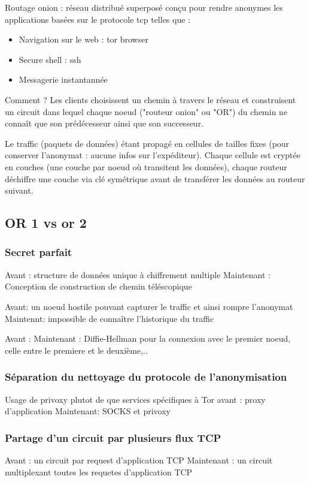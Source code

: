 \documentclass[12pt]{article}
\begin{document}
Routage onion : réseau distribué superposé conçu pour rendre anonymes les applications basées sur le protocole \acrshort{tcp} telles que :
\begin{itemize}
    \item Navigation sur le web : \acrshort{tor} browser
    \item Secure shell : ssh
    \item Messagerie instantannée
\end{itemize}

Comment ? 
Les clients choisissent un chemin à travers le réseau et construisent un circuit dans lequel chaque noeud ("routeur onion" ou "OR") du chemin ne connaît que son prédécesseur ainsi que son successeur.

Le traffic (paquets de données) étant propagé en cellules de tailles fixes (pour conserver l'anonymat : aucune infos sur l'expéditeur).
Chaque cellule est cryptée en couches (une couche par noeud où transitent les données), chaque routeur déchiffre une couche via clé symétrique avant de transférer les données au routeur suivant.

\subsection{OR 1 vs \acrshort{or} 2}
\subsubsection{Secret parfait}
Avant : structure de données unique à chiffrement multiple
Maintenant : Conception de construction de chemin téléscopique 

Avant: un noeud hostile pouvant capturer le traffic et ainsi rompre l'anonymat
Maintennt: impossible de connaître l'historique du traffic

Avant :
Maintenant : Diffie-Hellman pour la connexion avec le premier noeud, celle entre le premiere et le deuxième,..


\subsubsection{Séparation du nettoyage du protocole de l'anonymisation}

Usage de privoxy plutot de que services spécifiques à Tor
avant : proxy d'application
Maintenant: SOCKS et privoxy

\subsubsection{Partage d'un circuit par plusieurs flux TCP}
Avant : un circuit par request d'application TCP
Maintenant : un circuit multiplexant toutes les requetes d'application TCP
\end{document}

